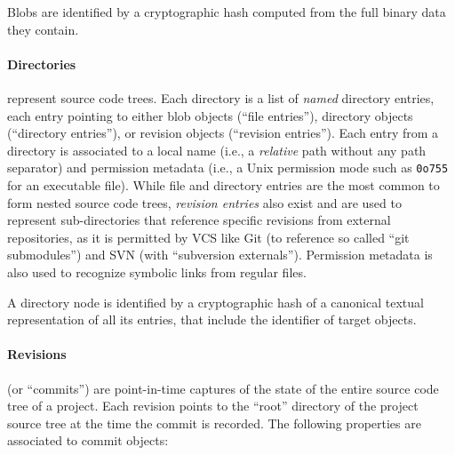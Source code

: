 Blobs are identified by a cryptographic hash computed from the full binary data
they contain.



\begin{figure}\centering
{}
\end{figure}
\paragraph{\textbf{Directories}} represent source code trees. Each directory is
a list of \emph{named} directory entries, each entry pointing to either blob
objects (``file entries''), directory objects (``directory entries''), or
revision objects (``revision entries''). Each entry from a directory is
associated to a local name (i.e., a \emph{relative} path without any path
separator) and permission metadata (i.e., a Unix permission mode such as
\texttt{0o755} for an executable file). While file and directory entries are
the most common to form nested source code trees, \emph{revision entries} also
exist and are used to represent sub-directories that reference specific
revisions from external repositories, as it is permitted by VCS like Git (to
reference so called ``git submodules'') and SVN (with ``subversion
externals''). Permission metadata is also used to recognize symbolic links from
regular files.

A directory node is identified by a cryptographic hash of a canonical textual
representation of all its entries, that include the identifier of target
objects.



\begin{figure}\centering
{}
\end{figure}
\paragraph{\textbf{Revisions}} (or ``commits'') are point-in-time captures of
the state of the entire source code tree of a project. Each revision points to
the ``root'' directory of the project source tree at the time the commit is
recorded. The following properties are associated to commit objects:

